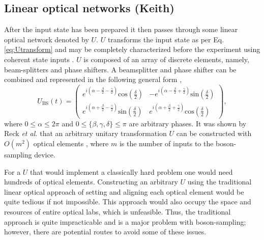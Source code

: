 \documentclass[aps,pra,twocolumn,amsmath,amssymb,nofootinbib,superscriptaddress]{revtex4}
\begin{document}
\subsection{Linear optical networks (Keith)}
After the input state has been prepared it then passes through some linear optical network denoted by $U$. $U$ transforms the input state as per Eq. \ref{eq:Utransform} and may be completely characterized before the experiment using coherent state inputs \cite{bib:PhysRevLett.73.58}. $U$ is composed of an array of discrete elements, namely, beam-splitters and phase shifters.  A beamsplitter and phase shifter can be combined and represented in the following general form \cite{bib:GerryKnight05},
\begin{equation} \label{eq:BS}
U_{\mathrm{BS}}(t) = \left( \begin{array}{cc}
e^{i(\alpha-\frac{\beta}{2}-\frac{\gamma}{2})}\mathrm{cos}\left(\frac{\delta}{2}\right) & -e^{i(\alpha-\frac{\beta}{2}+\frac{\gamma}{2})}\mathrm{sin}\left(\frac{\delta}{2}\right)  \\
e^{i(\alpha+\frac{\beta}{2}-\frac{\gamma}{2})}\mathrm{sin}\left(\frac{\delta}{2}\right) & e^{i(\alpha+\frac{\beta}{2}+\frac{\gamma}{2})}\mathrm{cos}\left(\frac{\delta}{2}\right)
\end{array} \right), 
\end{equation}
where $0\leq\alpha\leq2\pi$ and $0\leq\{\beta,\gamma,\delta\}\leq\pi$ are arbitrary phases. It was shown by Reck \emph{et al.} that an arbitrary unitary transformation $U$ can be constructed with  $O(m^2)$ optical elements \cite{bib:PhysRevLett.73.58}, where $m$ is the number of inputs to the boson-sampling device. 

For a $U$ that would implement a classically hard problem one would need hundreds of optical elements. Constructing an arbitrary $U$ using the traditional linear optical approach of setting and aligning each optical element would be quite tedious if not impossible. This approach would also occupy the space and resources of entire optical labs, which is unfeasible. Thus, the traditional approach is quite impracticable and is a major problem with boson-sampling; however, there are potential routes to avoid some of these issues.  
\end{document}
